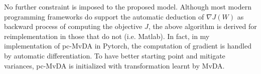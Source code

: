         No further constraint is imposed to the proposed model. Although most modern programming frameworks do support the automatic deduction of $\nabla J\left(W\right)$ as backward process of computing the objective $J$, the above algorithm is derived for reimplementation in those that do not (i.e. Matlab).
        In fact, in my implementation of pc-MvDA in Pytorch, the computation of gradient is handled by automatic differentiation.
        To have better starting point and mitigate variances, pc-MvDA is initialized with transformation learnt by MvDA.
